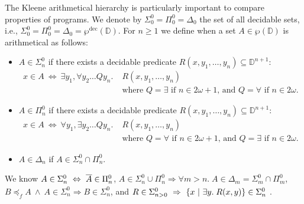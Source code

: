 \documentclass[runningheads]{llncs}
\def\ok#1{\mbox{\raisebox{0ex}[1ex][1ex]{$#1$}}}
\def\wprec{\wp^{\text{dec}}}
\newcommand{\Domain}{\mathbb{D}}
\newcommand{\compl}[1]{\ok{\overline{#1}}}
\newcommand{\Ra}{\Rightarrow}
\newcommand{\Lra}{\Leftrightarrow}
\def\ok#1{\mbox{\raisebox{0ex}[1ex][1ex]{$#1$}}}
\newcommand{\sset}[2]{\{#1  ~|~ #2\}}
\newcommand{\nat}{\omega}
\begin{document}
The Kleene arithmetical hierarchy is particularly important to compare properties of programs. 
We denote by $\Sigma^0_0=\Pi^0_0=\Delta_0$ the set of all decidable sets, i.e., $\Sigma^0_0=\Pi^0_0=\Delta_0 = \wprec(\Domain)$. 
For $n\geq 1$ we define when a set $A\in \wp(\Domain)$ is arithmetical as follows:
\begin{itemize}
\item $A\in\Sigma^0_n$ if there exists a decidable predicate $R(x,y_1,\ldots,y_n)\subseteq \Domain^{n+1}$:
\begin{align*}
x\in A~\Lra~\exists y_1,\forall y_2\ldots Q y_n.\;& R(x,y_1,\ldots,y_n)\\
&\mbox{where $Q=\exists$ if $n\in 2\nat+1$, and $Q=\forall$ if $n\in 2\nat$.}
\end{align*}
\item $A\in\Pi^0_n$ if there exists a decidable predicate $R(x,y_1,\ldots,y_n)\subseteq \Domain^{n+1}$:
\begin{align*}
x\in A~\Lra~\forall y_1,\exists y_2\ldots Q y_n.\;& R(x,y_1,\ldots,y_n)~\\
&\mbox{where $Q=\forall$ if $n\in 2\nat+1$, and $Q=\exists$ if $n\in 2\nat$.}
\end{align*}
\item $A\in\Delta_n$ if $A\in\Sigma^0_n\cap\Pi^0_n$.
\end{itemize}
We know $A\in\Sigma^0_n~\Lra~\compl{A}\in\Pi^0_n$, 
$A\in\Sigma^0_n\cup\Pi^0_n\Rightarrow\forall m>n.\; A\in\Delta_{m}=\Sigma^0_m\cap\Pi^0_m$, 
$B\preceq_f A~\wedge~ A\in\Sigma^0_n\Rightarrow B\in\Sigma^0_n$, and
 $\ok{R\in\Sigma^0_{n>0}}~ \Ra~ \sset{x}{\exists y.\;R(x,y)}\in\Sigma^0_n$ \cite{rogers}.

\end{document}

